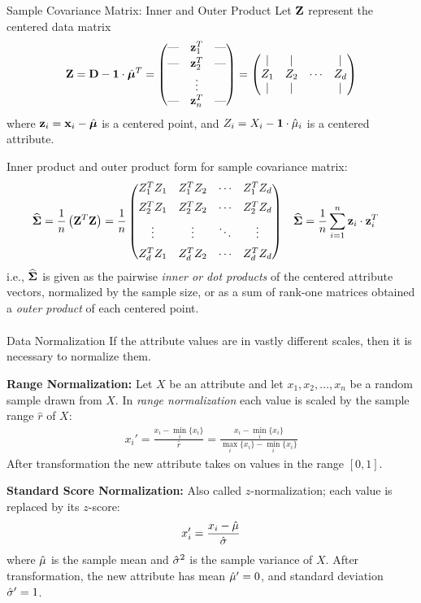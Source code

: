 \begin{frame}{Sample Covariance Matrix: Inner and Outer Product}
  \small
Let $\mathbf{Z}$ represent the centered data matrix
\begin{align*}
    \bZ  = \bD - \bone \cdot \hbmu^T
	    = \matr{\mbox{---} & \bz_1^T & \mbox{---} \\[0.2em]
    \mbox{---} & \bz_2^T& \mbox{---} \\[0.2em]
    & \vdots & \\
    \mbox{---} & \bz_n^T & \mbox{---}}
    = \matr{| & | &  & |\\
    Z_1 & Z_2 & \cdots & Z_d\\
    | & | &  & |}
\end{align*}
where $\mathbf{z}_i = \mathbf{x}_i - \hat{{\bm \mu}}$ is a centered point, and $Z_i = X_i -
\mathbf{1} \cdot \hat{\mu}_i$ is a centered attribute.

\medskip
Inner product and outer product 
form for sample covariance matrix:
\begin{align*}
    \hcov & = {1\over n} \lB(\bZ^T \bZ\rB)
   = {1 \over n} \matr{Z_1^T Z_1 & Z_1^T Z_2 & \cdots & Z_1^T
    Z_d\\[0.5em]
        Z_2^T Z_1 & Z_2^T Z_2 & \cdots & Z_2^T Z_d\\[0.5em]
        \vdots & \vdots & \ddots & \vdots\\[0.5em]
        Z_d^T Z_1 & Z_d^T Z_2 & \cdots & Z_d^T Z_d
    }
	& 
    \hcov & = {1\over n} \sum_{i=1}^n \bz_i \cdot \bz_i^T
\end{align*}
i.e., $\widehat{{\bm \Sigma}}$ is given as
the pairwise {\em inner or dot products} 
of the centered attribute vectors,
normalized by the sample size, or as a 
sum of rank-one matrices obtained a 
{\em outer product} of each centered point.
\begin{align*}
\end{align*}
\end{frame}


\begin{frame}{Data Normalization}
  If the attribute values are in vastly different scales, then it is
necessary to
normalize them.

\medskip
{\bf Range Normalization:}
Let $X$ be an attribute and let $x_1, x_2, \dots, x_n$ be a random
sample drawn from $X$.
In {\em range normalization} each value is scaled by the sample range
$\hat{r}$ of $X$:
\begin{align*}
    x_i' = \frac{x_i - \min_i\{x_i\}}{\hat{r}} =
    \frac{x_i - \min_i \{x_i\}}{\max_i\{x_i\} - \min_i\{x_i\}}
\end{align*}
After transformation the new attribute takes on values in the
range $[0,1]$.

\medskip
{\bf Standard Score Normalization: }
Also called $z$-normalization;
each value is replaced by its $z$-score:
\begin{equation*}
x_i' = \frac{x_i-\hat{\mu}}{\hat{\sigma}}
\end{equation*}
where $\hat{\mu}$ is the sample mean and $\hat{\sigma}^2$ is the sample
variance of $X$.
After transformation, the new attribute has mean $\hat{\mu}' = 0$,
and standard deviation $\hat{\sigma}' = 1$.
\end{frame}


